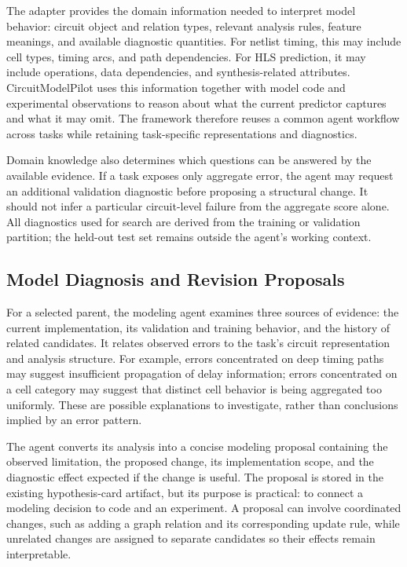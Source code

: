 The adapter provides the domain information needed to interpret model behavior: circuit object and relation types, relevant analysis rules, feature meanings, and available diagnostic quantities. For netlist timing, this may include cell types, timing arcs, and path dependencies. For HLS prediction, it may include operations, data dependencies, and synthesis-related attributes. CircuitModelPilot uses this information together with model code and experimental observations to reason about what the current predictor captures and what it may omit. The framework therefore reuses a common agent workflow across tasks while retaining task-specific representations and diagnostics.

Domain knowledge also determines which questions can be answered by the available evidence. If a task exposes only aggregate error, the agent may request an additional validation diagnostic before proposing a structural change. It should not infer a particular circuit-level failure from the aggregate score alone. All diagnostics used for search are derived from the training or validation partition; the held-out test set remains outside the agent's working context.

\subsection{Model Diagnosis and Revision Proposals}
\label{sec:hypothesis_protocol}

For a selected parent, the modeling agent examines three sources of evidence: the current implementation, its validation and training behavior, and the history of related candidates. It relates observed errors to the task's circuit representation and analysis structure. For example, errors concentrated on deep timing paths may suggest insufficient propagation of delay information; errors concentrated on a cell category may suggest that distinct cell behavior is being aggregated too uniformly. These are possible explanations to investigate, rather than conclusions implied by an error pattern.

The agent converts its analysis into a concise modeling proposal containing the observed limitation, the proposed change, its implementation scope, and the diagnostic effect expected if the change is useful. The proposal is stored in the existing hypothesis-card artifact, but its purpose is practical: to connect a modeling decision to code and an experiment. A proposal can involve coordinated changes, such as adding a graph relation and its corresponding update rule, while unrelated changes are assigned to separate candidates so their effects remain interpretable.

